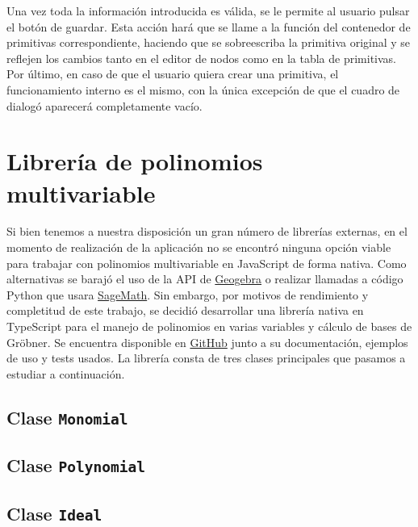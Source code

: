 Una vez toda la información introducida es válida, se le permite al usuario pulsar el botón de guardar. Esta acción hará que se llame a la función del contenedor de primitivas correspondiente, haciendo que se sobreescriba la primitiva original y se reflejen los cambios tanto en el editor de nodos como en la tabla de primitivas. Por último, en caso de que el usuario quiera crear una primitiva, el funcionamiento interno es el mismo, con la única excepción de que el cuadro de dialogó aparecerá completamente vacío.

\section{Librería de polinomios multivariable}
Si bien tenemos a nuestra disposición un gran número de librerías externas, en el momento de realización de la aplicación no se encontró ninguna opción viable para trabajar con polinomios multivariable en JavaScript de forma nativa. Como alternativas se barajó el uso de la API de \href{https://wiki.geogebra.org/en/Reference:GeoGebra_Apps_API}{Geogebra} o realizar llamadas a código Python que usara \href{https://www.sagemath.org/}{SageMath}. Sin embargo, por motivos de rendimiento y completitud de este trabajo, se decidió desarrollar una librería nativa en TypeScript para el manejo de polinomios en varias variables y cálculo de bases de Gröbner. Se encuentra disponible en \href{https://github.com/Daniel2000815/multivariate-polynomial}{GitHub} junto a su documentación, ejemplos de uso y tests usados. La librería consta de tres clases principales que pasamos a estudiar a continuación.

\subsection{Clase \texttt{Monomial}}

\subsection{Clase \texttt{Polynomial}}

\subsection{Clase \texttt{Ideal}}